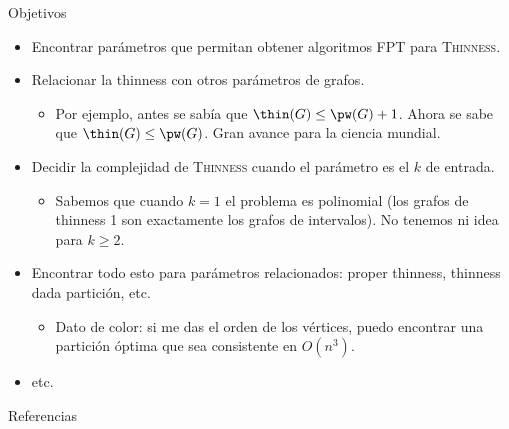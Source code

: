 \documentclass[spanish]{beamer}
\begin{document}
\begin{frame}{Objetivos}
    \begin{itemize}[<+->]
        \item Encontrar parámetros que permitan obtener algoritmos FPT para \textsc{Thinness}.
        \item Relacionar la thinness con otros parámetros de grafos.
        \begin{itemize}
            \item Por ejemplo, antes se sabía que $\thin(G) \leq \pw(G) + 1$. Ahora se sabe que $\thin(G) \leq \pw(G)$. Gran avance para la ciencia mundial.
        \end{itemize}
        \item Decidir la complejidad de \textsc{Thinness} cuando el parámetro es el $k$ de entrada.
        \begin{itemize}
            \item Sabemos que cuando $k=1$ el problema es polinomial (los grafos de thinness 1 son exactamente los grafos de intervalos). No tenemos ni idea para $k \geq 2$.
        \end{itemize}
        \item Encontrar todo esto para parámetros relacionados: proper thinness, thinness dada partición, etc.
        \begin{itemize}
            \item Dato de color: si me das el orden de los vértices, puedo encontrar una partición óptima que sea consistente en $O(n^3)$.
        \end{itemize}
        \item etc.
    \end{itemize}
\end{frame}

\begin{frame}{Referencias}
    
    
\end{frame}
\end{document}
